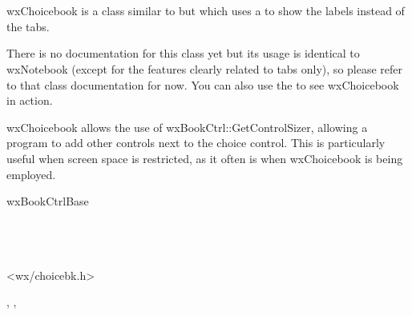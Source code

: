 
\section{}\label{wxchoicebook}

wxChoicebook is a class similar to  but which
uses a  to show the labels instead of the
tabs.

There is no documentation for this class yet but its usage is
identical to wxNotebook (except for the features clearly related to tabs
only), so please refer to that class documentation for now. You can also
use the  to see wxChoicebook in action.

wxChoicebook allows the use of wxBookCtrl::GetControlSizer, allowing a program
to add other controls next to the choice control. This is particularly useful
when screen space is restricted, as it often is when wxChoicebook is being employed.


wxBookCtrlBase\\
\\
\\
\\


<wx/choicebk.h>


\twocolwidtha{5cm}
\begin{twocollist}\itemsep=0pt


\end{twocollist}


, , 

